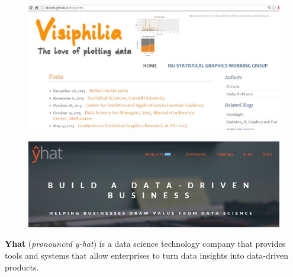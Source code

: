 \documentclass{beamer}
\begin{document}
\begin{frame}
\begin{figure}
\centering
\includegraphics[width=1.1\linewidth]{visiphilia}
\end{figure}
\end{frame}

\begin{frame}
	
\begin{figure}
\centering
\includegraphics[width=0.8\linewidth]{yhat}
\end{figure}
\Large
\textbf{Yhat} (\textit{pronounced y-hat}) is a data science technology company that provides tools and systems that allow enterprises to turn data insights into data-driven products.\\ \bigskip


\end{frame}
\end{document}
